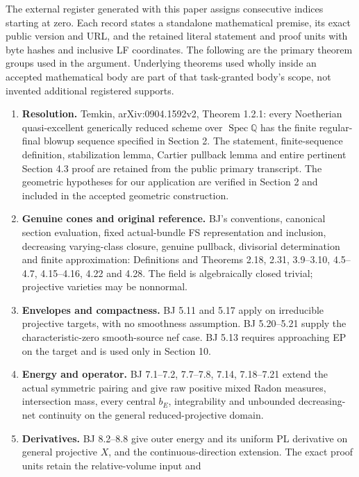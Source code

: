 \documentclass[
  10pt,
]{article}
\providecommand{\tightlist}{%
  \setlength{\itemsep}{0pt}\setlength{\parskip}{0pt}}
\begin{document}
The external register generated with this paper assigns consecutive
indices starting at zero. Each record states a standalone mathematical
premise, its exact public version and URL, and the retained literal
statement and proof units with byte hashes and inclusive LF coordinates.
The following are the primary theorem groups used in the argument.
Underlying theorems used wholly inside an accepted mathematical body are
part of that task-granted body's scope, not invented additional
registered supports.

\begin{enumerate}
\def\labelenumi{\arabic{enumi}.}
\tightlist
\item
  \textbf{Resolution.} Temkin, arXiv:0904.1592v2, Theorem 1.2.1: every
  Noetherian quasi-excellent generically reduced scheme over
  \(\operatorname{Spec}\mathbb Q\) has the finite regular-final blowup
  sequence specified in Section 2. The statement, finite-sequence
  definition, stabilization lemma, Cartier pullback lemma and entire
  pertinent Section 4.3 proof are retained from the public primary
  transcript. The geometric hypotheses for our application are verified
  in Section 2 and included in the accepted geometric construction.
\item
  \textbf{Genuine cones and original reference.} BJ's conventions,
  canonical section evaluation, fixed actual-bundle FS representation
  and inclusion, decreasing varying-class closure, genuine pullback,
  divisorial determination and finite approximation: Definitions and
  Theorems 2.18, 2.31, 3.9--3.10, 4.5--4.7, 4.15--4.16, 4.22 and 4.28.
  The field is algebraically closed trivial; projective varieties may be
  nonnormal.
\item
  \textbf{Envelopes and compactness.} BJ 5.11 and 5.17 apply on
  irreducible projective targets, with no smoothness assumption. BJ
  5.20--5.21 supply the characteristic-zero smooth-source nef case. BJ
  5.13 requires approaching EP on the target and is used only in Section
  10.
\item
  \textbf{Energy and operator.} BJ 7.1--7.2, 7.7--7.8, 7.14, 7.18--7.21
  extend the actual symmetric pairing and give raw positive mixed Radon
  measures, intersection mass, every central \(b_E\), integrability and
  unbounded decreasing-net continuity on the general reduced-projective
  domain.
\item
  \textbf{Derivatives.} BJ 8.2--8.8 give outer energy and its uniform PL
  derivative on general projective \(X\), and the continuous-direction
  extension. The exact proof units retain the relative-volume input and

\end{enumerate}
\end{document}
